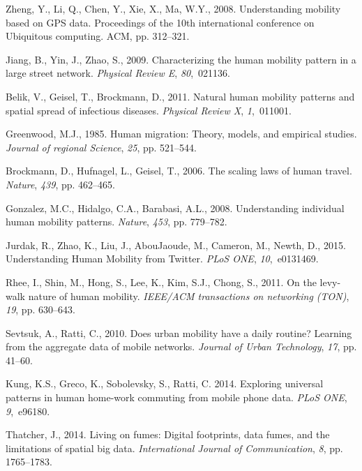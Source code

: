 \documentclass{elsart}
\begin{document}
\begin{thebibliography}{00}
Zheng, Y., Li, Q., Chen, Y., Xie, X., Ma, W.Y., 2008. Understanding mobility based on GPS data. Proceedings of the 10th international conference on Ubiquitous computing. ACM, pp. 312--321.

Jiang, B., Yin, J., Zhao, S., 2009. Characterizing the human mobility pattern in a large street network. {\em Physical Review E}, {\em 80},~021136.

Belik, V., Geisel, T., Brockmann, D., 2011. Natural human mobility patterns and spatial spread of infectious diseases. {\em Physical Review X}, {\em 1},~011001.

Greenwood, M.J., 1985. Human migration: Theory, models, and empirical studies. {\em Journal of regional Science}, {\em 25}, pp. 521--544.

Brockmann, D., Hufnagel, L., Geisel, T., 2006. The scaling laws of human travel. {\em Nature}, {\em 439}, pp. 462--465.

Gonzalez, M.C., Hidalgo, C.A., Barabasi, A.L., 2008. Understanding individual human mobility patterns. {\em Nature}, {\em 453}, pp. 779--782.

Jurdak, R., Zhao, K., Liu, J., AbouJaoude, M., Cameron, M., Newth, D., 2015. Understanding Human Mobility from Twitter. {\em PLoS ONE}, {\em 10},~e0131469.

Rhee, I., Shin, M., Hong, S., Lee, K., Kim, S.J., Chong, S., 2011. On the levy-walk nature of human mobility. {\em IEEE/ACM transactions on networking (TON)}, {\em 19}, pp. 630--643.

Sevtsuk, A., Ratti, C., 2010. Does urban mobility have a daily routine? Learning from the aggregate data of mobile networks. {\em Journal of Urban Technology}, {\em 17}, pp. 41--60.

Kung, K.S., Greco, K., Sobolevsky, S., Ratti, C. 2014. Exploring universal patterns in human home-work commuting from mobile phone data. {\em PLoS ONE}, {\em 9},~e96180.

Thatcher, J., 2014. Living on fumes: Digital footprints, data fumes, and the limitations of spatial big data. {\em International Journal of Communication}, {\em 8}, pp. 1765--1783.


\end{thebibliography}
\end{document}
